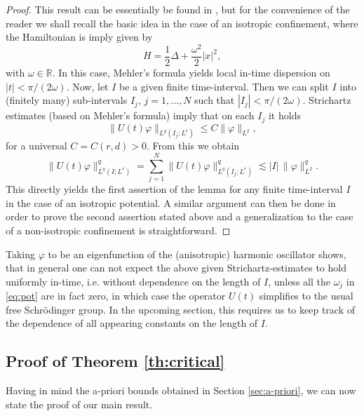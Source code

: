 \documentclass[a4paper,leqno]{amsart}
\theoremstyle{plain}
\theoremstyle{definition}
\numberwithin{equation}{section}
\begin{document}
\begin{proof} This result can be essentially be found in \cite[Propositon 3.3]{Car2}, but for the convenience of the reader we shall 
recall the basic idea in the case of an isotropic confinement, where the Hamiltonian is imply given by 
$$H= \frac{1}{2} \Delta + \frac{\omega^2}{2} {|x|^2},$$ 
with $\omega \in {{\mathbb R}}$. In this case, Mehler's formula yields local in-time dispersion on $|t| < \pi/(2\omega)$. 
Now, let $I$ be a given finite time-interval. Then we can split $I$ into (finitely many) sub-intervals $ I_j$, $j=1, \dots , N$ such that $|I_j |< \pi/(2\omega)$. 
Strichartz estimates (based on Mehler's formula) imply that on each $I_j$ it holds
$$ \| U(t) \varphi \|_{L^q(I_j; L^r)} {\leqslant} C \| \varphi \|_{L^2},$$
for a universal $C=C(r,d)>0$.
From this we obtain
$$
\| U(t) \varphi \|^q_{L^q(I; L^r)} = \sum_{j = 1}^N\| U(t) \varphi \|^q_{L^q(I_j; L^r)}  \lesssim |I|\,  \| \varphi \|^q_{L^2}.
$$ 
This directly yields the first assertion of the lemma for any finite time-interval $I$ in the case of an isotropic potential. A similar argument can then be done in order to prove the second assertion stated above and a 
generalization to the case of a non-isotropic confinement is straightforward.
\end{proof} 

Taking $\varphi$ to be an eigenfunction of the (anisotropic) harmonic oscillator shows, that in general one can not expect the above given 
Strichartz-estimates to hold uniformly in-time, i.e. without dependence on the length of $I$, unless all the $\omega_j$ in \eqref{eq:pot} are in fact zero, 
in which case the operator $U(t)$ simplifies to the usual free Schr\"odinger group. In the upcoming section, this requires us to 
keep track of the dependence of all appearing constants on the length of $I$.

\subsection{Proof of Theorem \ref{th:critical}}

Having in mind the a-priori bounds 
obtained in Section \ref{sec:a-priori}, we can now state the proof of our main result.
\end{document}
